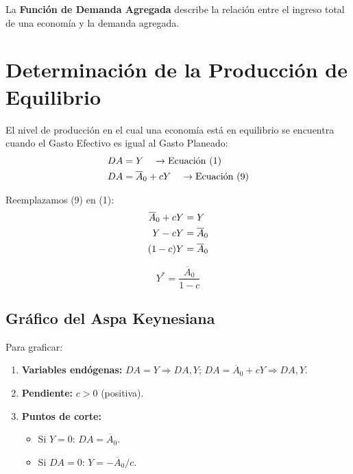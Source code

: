 \documentclass[11pt,a4paper]{article}
\newcommand{\barvar}[1]{\overline{#1}}
\begin{document}
La \textbf{Función de Demanda Agregada} describe la relación entre el ingreso total de una economía y la demanda agregada.

\section{Determinación de la Producción de Equilibrio}

El nivel de producción en el cual una economía está en equilibrio se encuentra cuando el Gasto Efectivo es igual al Gasto Planeado:
\begin{align}
    DA &= Y \quad \rightarrow \text{Ecuación (1)} \notag \\
    DA &= \barvar{A}_0 + cY \quad \rightarrow \text{Ecuación (9)} \notag
\end{align}

Reemplazamos (9) en (1):
\begin{align}
    \barvar{A}_0 + cY &= Y \notag \\
    Y - cY &= \barvar{A}_0 \notag \\
    (1-c)Y &= \barvar{A}_0 \notag
\end{align}

\begin{resultadobox}
\begin{equation}
    Y^* = \frac{\barvar{A}_0}{1 - c}
\end{equation}
\end{resultadobox}

\subsection{Gráfico del Aspa Keynesiana}

Para graficar:
\begin{enumerate}
    \item \textbf{Variables endógenas:} $DA = Y \Rightarrow DA, Y$; \quad $DA = \barvar{A}_0 + cY \Rightarrow DA, Y$.
    \item \textbf{Pendiente:} $c > 0$ (positiva).
    \item \textbf{Puntos de corte:}
    \begin{itemize}
        \item Si $Y=0$: $DA = \barvar{A}_0$.
        \item Si $DA = 0$: $Y = -\barvar{A}_0 / c$.
    \end{itemize}
\end{enumerate}
\end{document}
